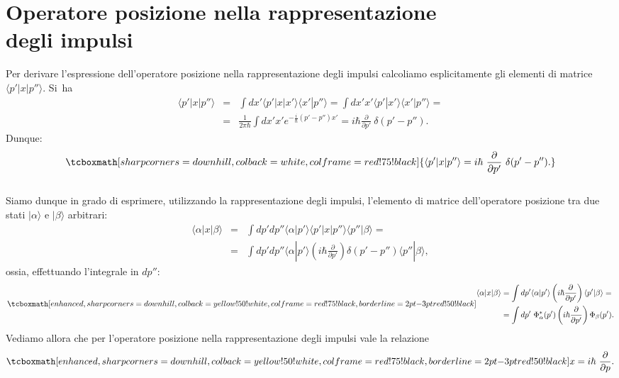 \section[Operatore posizione nella rappresentazione degli impulsi]{Operatore posizione nella rappresentazione\\degli impulsi}
Per derivare l'espressione dell'operatore posizione nella rappresentazione degli impulsi calcoliamo esplicitamente gli elementi di matrice $\langle p' | x | p'' \rangle$. Si~ha
	\begin{eqnarray}
		\langle p' | x | p'' \rangle &=& \int dx' \langle p' | x | x' \rangle \langle x' | p'' \rangle =  \int dx' x' \langle p' | x' \rangle \langle x' | p'' \rangle = \nonumber\\
		&=& \frac{1}{2 \pi \hbar} \int dx' x' e^{-\frac{i}{\hbar} (p'-p'') x'} =   i \hbar \frac{\partial}{\partial p'} ~\delta(p' - p'').
	\end{eqnarray}
Dunque:
	\begin{equation}
		\tcboxmath[sharp corners=downhill ,colback=white,colframe=red!75!black]{		
			\langle p' | x | p'' \rangle = i \hbar~ \frac{\partial}{\partial p'} ~\delta(p' - p'').
			}
	\end{equation}\\
	
Siamo dunque in grado di esprimere, utilizzando la rappresentazione degli impulsi, l'elemento di matrice dell'operatore posizione tra due stati $| \alpha \rangle$ e $| \beta \rangle$ arbitrari:
	\begin{eqnarray}
		\langle \alpha | x | \beta \rangle &=& \int dp' dp'' \langle \alpha | p' \rangle \langle p' | x | p'' \rangle \langle p'' | \beta \rangle = \nonumber \\
		&=& \int dp' dp'' \langle \alpha | p' \rangle \left(i \hbar \frac{\partial}{\partial p'} \right) \delta(p'-p'') \langle p'' | \beta \rangle,
	\end{eqnarray}
ossia, effettuando l'integrale in $dp''$:
	\begin{equation}
		\tcboxmath[enhanced,sharp corners=downhill ,colback=yellow!50!white,colframe=red!75!black, borderline={2pt}{-3pt}{red!50!black}]{
		\begin{aligned}
			\langle \alpha | x | \beta \rangle &= \int dp' \langle \alpha | p' \rangle \left(i \hbar \frac{\partial}{\partial p'} \right) \langle p' | \beta \rangle = \\
			&= \int dp'~ \Phi ^* _\alpha(p') \left(i \hbar \frac{\partial}{\partial p'} \right) \Phi_\beta(p').
		\end{aligned}
		}
	\end{equation}
Vediamo allora che per l'operatore posizione nella rappresentazione degli impulsi vale la relazione
	\begin{equation}
		\tcboxmath[enhanced,sharp corners=downhill ,colback=yellow!50!white,colframe=red!75!black, borderline={2pt}{-3pt}{red!50!black}]{
			x = i \hbar~ \frac{\partial}{\partial p} .
			}
	\end{equation}

